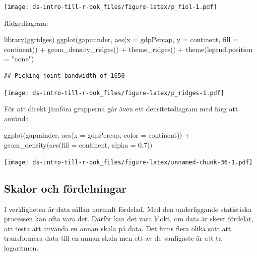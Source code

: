 \documentclass[
]{book}
\newenvironment{Shaded}{\begin{snugshade}}{\end{snugshade}}
\newcommand{\AttributeTok}[1]{\textcolor[rgb]{0.77,0.63,0.00}{#1}}
\newcommand{\FloatTok}[1]{\textcolor[rgb]{0.00,0.00,0.81}{#1}}
\newcommand{\FunctionTok}[1]{\textcolor[rgb]{0.00,0.00,0.00}{#1}}
\newcommand{\NormalTok}[1]{#1}
\newcommand{\SpecialCharTok}[1]{\textcolor[rgb]{0.00,0.00,0.00}{#1}}
\newcommand{\StringTok}[1]{\textcolor[rgb]{0.31,0.60,0.02}{#1}}
\begin{document}
\texttt{[image: ds-intro-till-r-bok\_files/figure-latex/p\_fiol-1.pdf]}

Ridgediagram:

\begin{Shaded}
\begin{Highlighting}[]
\FunctionTok{library}\NormalTok{(ggridges)}
\FunctionTok{ggplot}\NormalTok{(gapminder, }\FunctionTok{aes}\NormalTok{(}\AttributeTok{x =}\NormalTok{ gdpPercap, }\AttributeTok{y =}\NormalTok{ continent, }\AttributeTok{fill =}\NormalTok{ continent)) }\SpecialCharTok{+}
  \FunctionTok{geom\_density\_ridges}\NormalTok{() }\SpecialCharTok{+}
  \FunctionTok{theme\_ridges}\NormalTok{() }\SpecialCharTok{+} 
  \FunctionTok{theme}\NormalTok{(}\AttributeTok{legend.position =} \StringTok{"none"}\NormalTok{)}
\end{Highlighting}
\end{Shaded}

\begin{verbatim}
## Picking joint bandwidth of 1650
\end{verbatim}

\texttt{[image: ds-intro-till-r-bok\_files/figure-latex/p\_ridges-1.pdf]}

För att direkt jämföra grupperna går även ett densitetsdiagram med färg att använda

\begin{Shaded}
\begin{Highlighting}[]
\FunctionTok{ggplot}\NormalTok{(gapminder, }\FunctionTok{aes}\NormalTok{(}\AttributeTok{x =}\NormalTok{ gdpPercap, }\AttributeTok{color =}\NormalTok{ continent)) }\SpecialCharTok{+}
  \FunctionTok{geom\_density}\NormalTok{(}\FunctionTok{aes}\NormalTok{(}\AttributeTok{fill =}\NormalTok{ continent, }\AttributeTok{alpha =} \FloatTok{0.7}\NormalTok{))}
\end{Highlighting}
\end{Shaded}

\texttt{[image: ds-intro-till-r-bok\_files/figure-latex/unnamed-chunk-36-1.pdf]}

\hypertarget{skalor-och-fuxf6rdelningar}{%
\subsection{Skalor och fördelningar}\label{skalor-och-fuxf6rdelningar}}

I verkligheten är data sällan normalt fördelad. Med den underliggande statistiska processen kan ofta vara det. Därför kan det vara klokt, om data är skevt fördelat, att testa att använda en annan skala på data. Det finns flera olika sätt att transformera data till en annan skala men ett av de vanligaste är att ta logaritmen.
\end{document}
